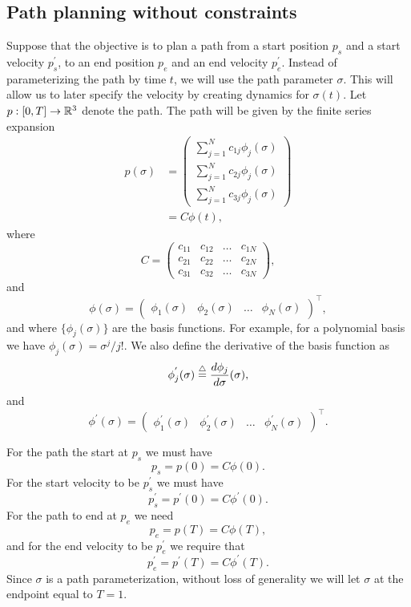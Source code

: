 \subsection{Path planning without constraints}
Suppose that the objective is to plan a path from a start position $p_s$ and a start velocity $p_s^{'}$, to an end position $p_e$ and an end velocity $p_e^{'}$.  Instead of parameterizing the path by time $t$, we will use the path parameter $\sigma$.  This will allow us to later specify the velocity by creating dynamics for $\sigma(t)$.  Let  $p:[0,T]\to{\mathbb{R}}^3$ denote the path.  The path will be given by the finite series expansion
\begin{align*}
p(\sigma) &= \begin{pmatrix} \sum_{j=1}^N c_{1j} \phi_j(\sigma) \\  \sum_{j=1}^N c_{2j} \phi_j(\sigma) \\  \sum_{j=1}^N c_{3j} \phi_j(\sigma) \end{pmatrix} \\
&= C\phi(t),
\end{align*}
where 
\[
C = \begin{pmatrix} c_{11} & c_{12} & \dots & c_{1N} \\ c_{21} & c_{22} & \dots & c_{2N} \\c_{31} & c_{32} & \dots & c_{3N} \end{pmatrix},
\]
and
\[
\phi(\sigma) = \begin{pmatrix} \phi_1(\sigma) & \phi_2(\sigma) & \dots & \phi_N(\sigma) \end{pmatrix}^{\top},
\]
and where $\{\phi_j(\sigma)\}$ are the basis functions.  For example, for a polynomial basis we have $\phi_j(\sigma)=\sigma^j/j!$. We also define the derivative of the basis function as
\[
\phi_j^{'}(\sigma)\stackrel{\triangle}{=}\frac{d\phi_j}{d\sigma}(\sigma),
\]
and 
\[
\phi^{'}(\sigma) = \begin{pmatrix} \phi_1^{'}(\sigma) & \phi_2^{'}(\sigma) & \dots & \phi_N^{'}(\sigma) \end{pmatrix}^{\top}.
\]

For the path the start at $p_s$ we must have
\[
p_s = p(0)= C\phi(0).
\]
For the start velocity to be $p_s^{'}$ we must have
\[
p_s^{'} = p^{'}(0) = C\phi^{'}(0).
\]
For the path to end at $p_e$ we need
\[
p_e = p(T)= C\phi(T),
\]
and for the end velocity to be $p_e^{'}$ we require that
\[
p_e^{'} = p^{'}(T) = C\phi^{'}(T).
\]
Since $\sigma$ is a path parameterization, without loss of generality we will let $\sigma$ at the endpoint equal to $T=1$.

